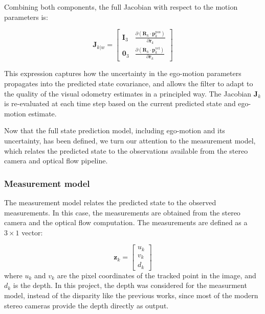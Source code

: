 Combining both components, the full Jacobian with respect to the motion parameters is:

\begin{equation}
  \mathbf{J}_{k|w} =
  \begin{bmatrix}
    \mathbf{I}_3 & \frac{\partial (\mathbf{R}_k \cdot \mathbf{p}^{\text{pos}}_k)}{\partial \mathbf{r}_k} \\
    \mathbf{0}_3 & \frac{\partial (\mathbf{R}_k \cdot \mathbf{p}^{\text{vel}}_k)}{\partial \mathbf{r}_k}
  \end{bmatrix}
\end{equation}


This expression captures how the uncertainty in the ego-motion parameters propagates into the predicted state 
covariance, and allows the filter to adapt to the quality of the visual odometry estimates in a principled way. 
The Jacobian \( \mathbf{J}_k \) is re-evaluated at each time step based on the current predicted state and ego-motion estimate.

Now that the full state prediction model, including ego-motion and its uncertainty, has been defined, we turn our attention 
to the measurement model, which relates the predicted state to the observations available from the stereo camera and 
optical flow pipeline.


\subsubsection{Measurement model}
\label{sec:KalmanFilterMeasurementModel}

The measurement model relates the predicted state to the observed measurements. In this case, the measurements are
obtained from the stereo camera and the optical flow computation. The measurements are defined as a $3 \times 1$ vector:

\begin{equation}
  \mathbf{z}_k =
  \begin{bmatrix}
    u_k \\
    v_k \\
    d_k
  \end{bmatrix}
\end{equation}
where \( u_k \) and \( v_k \) are the pixel coordinates of the tracked point in the image, and \( d_k \) is the depth.
In this project, the depth was considered for the measurment model, instead of the disparity like the previous works,
since most of the modern stereo cameras provide the depth directly as output. 

